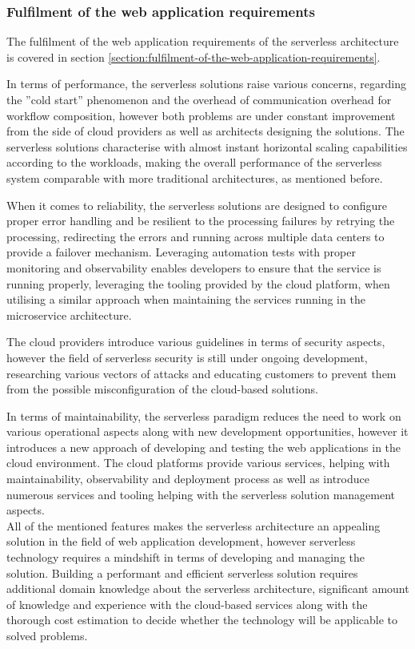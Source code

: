 \subsubsection{Fulfilment of the web application requirements}

The fulfilment of the web application requirements of the serverless architecture is covered in section \ref{section:fulfilment-of-the-web-application-requirements}.

In terms of performance, the serverless solutions raise various concerns, regarding the ''cold start'' phenomenon and the overhead of communication overhead for workflow composition, however both problems are under constant improvement from the side of cloud providers as well as architects designing the solutions.
The serverless solutions characterise with almost instant horizontal scaling capabilities according to the workloads, making the overall performance of the serverless system comparable with more traditional architectures, as mentioned before.

When it comes to reliability, the serverless solutions are designed to configure proper error handling and be resilient to the processing failures by retrying the processing, redirecting the errors and running across multiple data centers to provide a failover mechanism.
Leveraging automation tests with proper monitoring and observability enables developers to ensure that the service is running properly, leveraging the tooling provided by the cloud platform, when utilising a similar approach when maintaining the services running in the microservice architecture.

The cloud providers introduce various guidelines in terms of security aspects, however the field of serverless security is still under ongoing development, researching various vectors of attacks and educating customers to prevent them from the possible misconfiguration of the cloud-based solutions.

In terms of maintainability, the serverless paradigm reduces the need to work on various operational aspects along with new development opportunities, however it introduces a new approach of developing and testing the web applications in the cloud environment.
The cloud platforms provide various services, helping with maintainability, observability and deployment process as well as introduce numerous services and tooling helping with the serverless solution management aspects. \\

All of the mentioned features makes the serverless architecture an appealing solution in the field of web application development, however serverless technology requires a mindshift in terms of developing and managing the solution.
Building a performant and efficient serverless solution requires additional domain knowledge about the serverless architecture, significant amount of knowledge and experience with the cloud-based services along with the thorough cost estimation to decide whether the technology will be applicable to solved problems.

